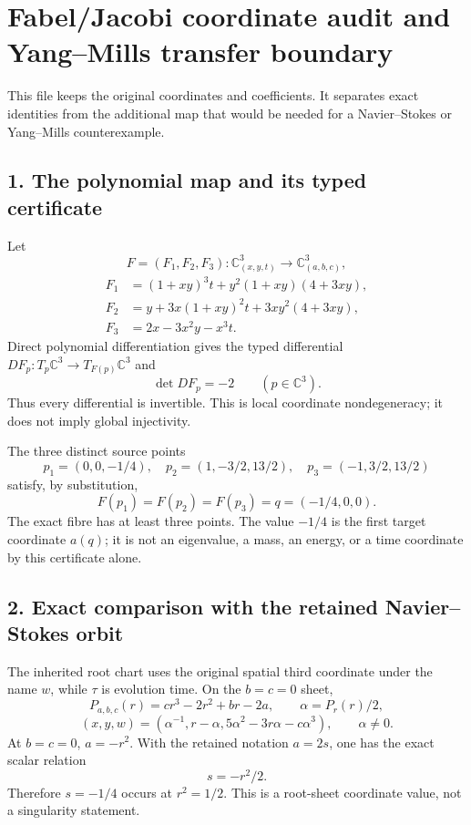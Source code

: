 \section{Fabel/Jacobi coordinate audit and Yang--Mills transfer
boundary}\label{fabel-jacobi-to-ym-coordinate-audit-md-fabeljacobi-coordinate-audit-and-yangmills-transfer-boundary}

This file keeps the original coordinates and coefficients. It separates
exact identities from the additional map that would be needed for a
Navier--Stokes or Yang--Mills counterexample.

\subsection{1. The polynomial map and its typed
certificate}\label{fabel-jacobi-to-ym-coordinate-audit-md-the-polynomial-map-and-its-typed-certificate}

Let \[
F=(F_1,F_2,F_3):\mathbb C^3_{(x,y,t)}\to\mathbb C^3_{(a,b,c)},
\] \[
\begin{aligned}
F_1&=(1+xy)^3t+y^2(1+xy)(4+3xy),\\
F_2&=y+3x(1+xy)^2t+3xy^2(4+3xy),\\
F_3&=2x-3x^2y-x^3t.
\end{aligned}
\] Direct polynomial differentiation gives the typed differential
\(DF_p:T_p\mathbb C^3\to T_{F(p)}\mathbb C^3\) and \[
\det DF_p=-2\qquad(p\in\mathbb C^3).
\] Thus every differential is invertible. This is local coordinate
nondegeneracy; it does not imply global injectivity.

The three distinct source points \[
p_1=(0,0,-1/4),\quad p_2=(1,-3/2,13/2),\quad p_3=(-1,3/2,13/2)
\] satisfy, by substitution, \[
F(p_1)=F(p_2)=F(p_3)=q=(-1/4,0,0).
\] The exact fibre has at least three points. The value \(-1/4\) is the
first target coordinate \(a(q)\); it is not an eigenvalue, a mass, an
energy, or a time coordinate by this certificate alone.

\subsection{2. Exact comparison with the retained Navier--Stokes
orbit}\label{fabel-jacobi-to-ym-coordinate-audit-md-exact-comparison-with-the-retained-navierstokes-orbit}

The inherited root chart uses the original spatial third coordinate
under the name \(w\), while \(\tau\) is evolution time. On the \(b=c=0\)
sheet, \[
P_{a,b,c}(r)=cr^3-2r^2+br-2a,\qquad \alpha=P_r(r)/2,
\] \[
(x,y,w)=(\alpha^{-1},r-\alpha,5\alpha^2-3r\alpha-c\alpha^3),\qquad \alpha\ne0.
\] At \(b=c=0\), \(a=-r^2\). With the retained notation \(a=2s\), one
has the exact scalar relation \[
s=-r^2/2.
\] Therefore \(s=-1/4\) occurs at \(r^2=1/2\). This is a root-sheet
coordinate value, not a singularity statement.

